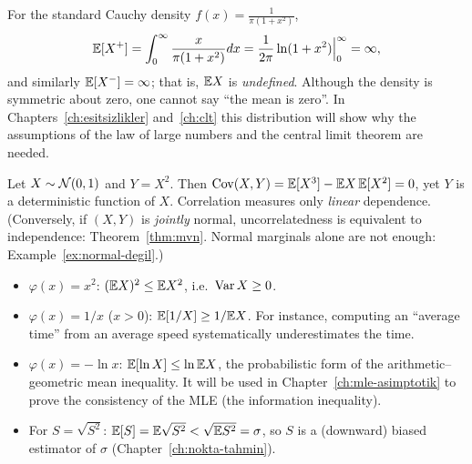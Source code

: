 \documentclass[main.tex]{subfiles}
\begin{document}
\begin{example}\label{ex:cauchy-beklenen}
For the standard Cauchy density $f(x)=\frac{1}{\pi(1+x^2)}$,
\[
\mathbb{E}[X^+]=\int_0^\infty\frac{x}{\pi(1+x^2)}dx=\frac{1}{2\pi}\ln(1+x^2)\Big|_0^\infty=\infty,
\]
and similarly $\mathbb{E}[X^-]=\infty$; that is, $\mathbb{E} X$ is \emph{undefined}. Although the density is symmetric about zero, one cannot say ``the mean is zero''. In Chapters~\ref{ch:esitsizlikler} and~\ref{ch:clt} this distribution will show why the assumptions of the law of large numbers and the central limit theorem are needed.
\end{example}

\begin{example}\label{ex:iliskisiz-bagimli}
Let $X\sim\mathcal{N}(0,1)$ and $Y=X^2$. Then $\operatorname{Cov}(X,Y)=\mathbb{E}[X^3]-\mathbb{E} X\,\mathbb{E}[X^2]=0$, yet $Y$ is a deterministic function of $X$. Correlation measures only \emph{linear} dependence. (Conversely, if $(X,Y)$ is \emph{jointly} normal, uncorrelatedness is equivalent to independence: Theorem~\ref{thm:mvn}. Normal marginals alone are not enough: Example~\ref{ex:normal-degil}.)
\end{example}

\begin{example}
\begin{itemize}
  \item $\varphi(x)=x^2$: $(\mathbb{E} X)^2\le\mathbb{E} X^2$, i.e.\ $\operatorname{Var} X\ge0$.
  \item $\varphi(x)=1/x$ ($x>0$): $\mathbb{E}[1/X]\ge1/\mathbb{E} X$. For instance, computing an ``average time'' from an average speed systematically underestimates the time.
  \item $\varphi(x)=-\ln x$: $\mathbb{E}[\ln X]\le\ln\mathbb{E} X$, the probabilistic form of the arithmetic--geometric mean inequality. It will be used in Chapter~\ref{ch:mle-asimptotik} to prove the consistency of the MLE (the information inequality).
  \item For $S=\sqrt{S^2}$: $\mathbb{E}[S]=\mathbb{E}\sqrt{S^2}<\sqrt{\mathbb{E} S^2}=\sigma$, so $S$ is a (downward) biased estimator of $\sigma$ (Chapter~\ref{ch:nokta-tahmin}).
\end{itemize}
\end{example}
\end{document}
